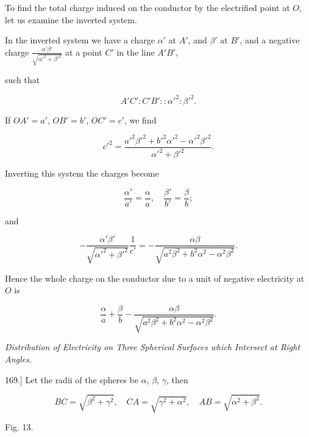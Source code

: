 \documentclass[11pt,a4paper]{article}
\begin{document}
To find the total charge induced on the conductor by the electrified
point at $O$, let us examine the inverted system.

In the inverted system we have a charge $\alpha'$ at $A'$, and
$\beta'$ at $B'$, and a negative charge
$\frac{\alpha'\beta'}{\sqrt{\alpha'^2+\beta'^2}}$ at a point $C'$ in
the line $A'B'$,

such that

\[
A'C':C'B'::\alpha'^2:\beta'^2.
\]

If $OA'=a'$, $OB'=b'$, $OC'=c'$, we find

\[
c'^{2} =
\frac{a'^{2}\beta'^{2}+b'^{2}\alpha'^{2}-\alpha'^{2}\beta'^{2}}
{\alpha'^{2}+\beta'^{2}}.
\]

Inverting this system the charges become

\[
\frac{\alpha'}{a'}=\frac{\alpha}{a}, \quad
\frac{\beta'}{b'}=\frac{\beta}{b};
\]

and

\[
-\frac{\alpha'\beta'}{\sqrt{\alpha'^2+\beta'^2}}\frac{1}{c'}
=-\frac{\alpha\beta}
{\sqrt{a^2\beta^2+b^2\alpha^2-\alpha^2\beta^2}}.
\]

Hence the whole charge on the conductor due to a unit of negative
electricity at $O$ is

\[
\frac{\alpha}{a}+\frac{\beta}{b}
-\frac{\alpha\beta}
{\sqrt{a^2\beta^2+b^2\alpha^2-\alpha^2\beta^2}}.
\]

\begin{center}
\textit{Distribution of Electricity on Three Spherical Surfaces which
Intersect at Right Angles.}
\end{center}

169.] Let the radii of the spheres be $\alpha$, $\beta$, $\gamma$,
then

\[
BC=\sqrt{\beta^2+\gamma^2},\quad
CA=\sqrt{\gamma^2+\alpha^2},\quad
AB=\sqrt{\alpha^2+\beta^2}.
\]

\begin{center}

Fig. 13.
\end{center}
\end{document}
